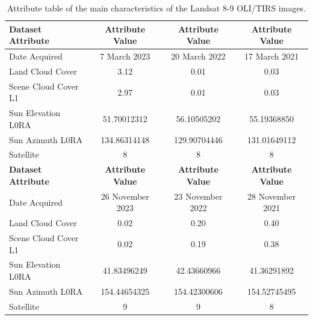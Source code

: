 \documentclass[water,article,accept,pdftex,oneauhor]{Definitions/mdpi}
\begin{document}
\begin{table}[H]
\caption{Attribute table of the main characteristics of the Landsat 8-9 OLI/TIRS images.} \label{tab01}
\begin{tabularx}{\textwidth}{lCCC}
    \toprule
       	\textbf{Dataset Attribute} & \textbf{Attribute Value} & \textbf{Attribute Value} & \textbf{Attribute Value} \\ \midrule
        {{Date Acquired%
} 
} & {{7 March 2023} %
} & {{20 March 2022}} & {{17 March 2021}} \\ \midrule
        {{Land Cloud Cover}} & 3.12 & 0.01 & 0.03 \\ \midrule
        {{Scene Cloud Cover L1}} & 2.97 & 0.01 & 0.03 \\ \midrule
        {{Sun Elevation L0RA}} & 51.70012312 & 56.10505202 & 55.19368850 \\ \midrule
        {{Sun Azimuth L0RA}} & 134.86314148 & 129.90704446 & 131.01649112 \\ \midrule
        {{Satellite}} & 8 & 8 & 8 \\
        \midrule
      {\textbf{Dataset Attribute}} & \textbf{Attribute Value} & \textbf{Attribute Value} & \textbf{Attribute Value} \\ \midrule
        {{Date Acquired}} & {{26 November 2023}} & {{23 November 2022}} & {{28 November 2021}} \\ \midrule
        {{Land Cloud Cover}} & 0.02 & 0.20 & 0.40 \\ \midrule
        {{Scene Cloud Cover L1}} & 0.02 & 0.19 & 0.38 \\ \midrule
        {{Sun Elevation L0RA}} & 41.83496249 & 42.43660966 & 41.36291892 \\ \midrule
        {{Sun Azimuth L0RA}} & 154.44654325 & 154.42300606 & 154.52745495 \\ \midrule
        {{Satellite}} & 9 & 9 & 8 \\
        \bottomrule
    \end{tabularx}
\end{table}
\end{document}
